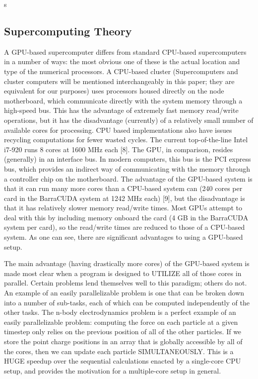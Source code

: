 s\documentclass[10pt]{article}
\begin{document}
\subsection{Supercomputing Theory}
A GPU-based supercomputer differs from standard CPU-based supercomputers in a number of ways: the most obvious one of these is the actual location and type of the numerical processors. A CPU-based cluster (Supercomputers and cluster computers will be mentioned interchangeably in this paper; they are equivalent for our purposes) uses processors housed directly on the node motherboard, which communicate directly with the system memory through a high-speed bus. This has the advantage of extremely fast memory read/write operations, but it has the disadvantage (currently) of a relatively small number of available cores for processing. CPU based implementations also have issues recycling computations for fewer wasted cycles. The current top-of-the-line Intel i7-920 runs 8 cores at 1600 MHz each [8]. The GPU, in comparison, resides (generally) in an interface bus. In modern computers, this bus is the PCI express bus, which provides an indirect way of communicating with the memory through a controller chip on the motherboard. The advantage of the GPU-based system is that it can run many more cores than a CPU-based system can (240 cores per card in the BarraCUDA system at 1242 MHz each) [9], but the disadvantage is that it has relatively slower memory read/write times. Most GPUs attempt to deal with this by including memory onboard the card (4 GB in the BarraCUDA system per card), so the read/write times are reduced to those of a CPU-based system. As one can see, there are significant advantages to using a GPU-based setup.

The main advantage (having drastically more cores) of the GPU-based system is made most clear when a program is designed to UTILIZE all of those cores in parallel. Certain problems lend themselves well to this paradigm; others do not. An example of an easily parallelizable problem is one that can be broken down into a number of sub-tasks, each of which can be computed independently of the other tasks. The n-body electrodynamics problem is a perfect example of an easily parallelizable problem: computing the force on each particle at a given timestep only relies on the previous position of all of the other particles. If we store the point charge positions in an array that is globally accessible by all of the cores, then we can update each particle SIMULTANEOUSLY. This is a HUGE speedup over the sequential calculations enacted by a single-core CPU setup, and provides the motivation for a multiple-core setup in general.
\end{document}

